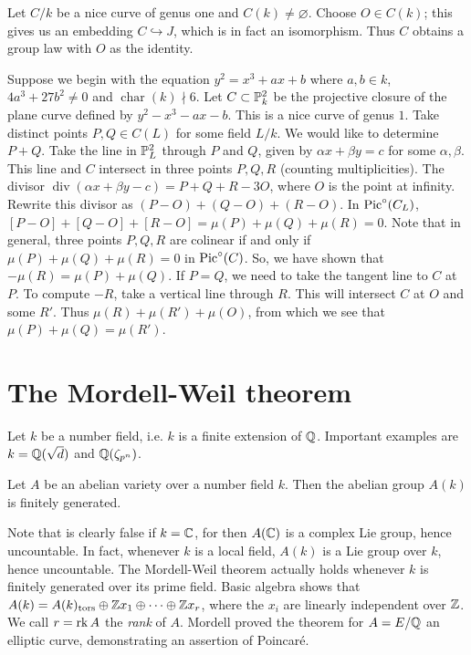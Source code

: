 \documentclass{article}
\begin{document}
\begin{example}
Let $C/k$ be a nice curve of genus one and $C(k)\ne\varnothing$. Choose 
$O\in C(k)$; this gives us an embedding $C\hookrightarrow J$, which is in fact 
an isomorphism. Thus $C$ obtains a group law with $O$ as the identity. 

Suppose we begin with the equation $y^2=x^3 + a x+b$ where $a,b\in k$, 
$4 a^3+27 b^2\ne 0$ and $\operatorname{char}(k)\nmid 6$. Let 
$C\subset \mathbb{P}_k^2$ be the projective closure of the plane curve defined 
by $y^2-x^3-a x-b$. This is a nice curve of genus $1$. Take distinct points 
$P,Q\in C(L)$ for some field $L/k$. We would like to determine $P+Q$. Take the 
line in $\mathbb{P}_L^2$ through $P$ and $Q$, given by $\alpha x+\beta y = c$ 
for some $\alpha,\beta$. This line and $C$ intersect in three points $P,Q,R$ 
(counting multiplicities). The divisor 
$\operatorname{div}(\alpha x+\beta y - c) = P+Q+R - 3 O$, where $O$ is the 
point at infinity. Rewrite this divisor as $(P-O)+(Q-O)+(R-O)$. In 
$\operatorname{Pic}^\circ(C_L)$, $[P-O] + [Q-O] + [R-O] = \mu(P)+\mu(Q)+\mu(R) = 0$. Note 
that in general, three points $P,Q,R$ are colinear if and only if 
$\mu(P)+\mu(Q)+\mu(R) = 0$ in $\operatorname{Pic}^\circ(C)$. So, we have shown that 
$-\mu(R) = \mu(P)+\mu(Q)$. If $P=Q$, we need to take the tangent line to $C$ at 
$P$. To compute $-R$, take a vertical line through $R$. This will intersect 
$C$ at $O$ and some $R'$. Thus $\mu(R)+\mu(R')+\mu(O)$, from which we see that 
$\mu(P)+\mu(Q) = \mu(R')$. 
\end{example}










\section{The Mordell-Weil theorem}

Let $k$ be a number field, i.e. $k$ is a finite extension of $\mathbb{Q}$. Important 
examples are $k=\mathbb{Q}(\sqrt d)$ and $\mathbb{Q}(\zeta_{p^n})$. 

\begin{theorem}
Let $A$ be an abelian variety over a number field $k$. Then the abelian group 
$A(k)$ is finitely generated.
\end{theorem}

Note that is clearly false if $k=\mathbb{C}$, for then $A(\mathbb{C})$ is a complex Lie 
group, hence uncountable. In fact, whenever $k$ is a local field, $A(k)$ is a 
Lie group over $k$, hence uncountable. The Mordell-Weil theorem actually holds 
whenever $k$ is finitely generated over its prime field. Basic algebra shows 
that $A(k) = A(k)_\text{tors}\oplus \mathbb{Z} x_1\oplus \cdots \oplus \mathbb{Z} x_r$, where 
the $x_i$ are linearly independent over $\mathbb{Z}$. We call $r=\operatorname{rk} A$ 
the \emph{rank} of $A$. Mordell proved the theorem for $A=E/\mathbb{Q}$ an elliptic 
curve, demonstrating an assertion of Poincar\'e.
\end{document}
